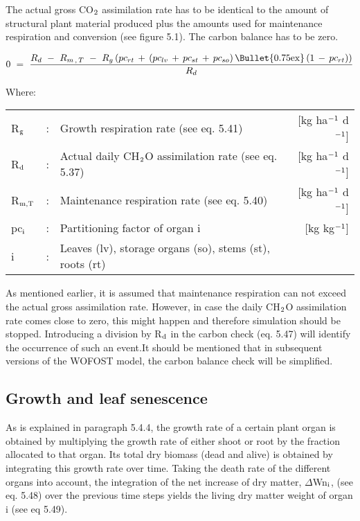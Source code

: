 The actual gross CO$_{{\rm 2}}$ assimilation rate has to be identical to the amount of structural plant
material produced plus the amounts used for maintenance respiration and conversion (see
figure 5.1). The carbon balance has to be zero. 

\begin{equation}
0~=~{\frac{R _{d} ~-~ R _{m\, ,\, T} ~-~ R _{g} \, (pc _{rt} \, +\, (pc _{lv} \, +\, pc _{st} \, +\, pc _{so} )\, {\rm \Bullet{0.75ex}}\, (1\, -\, pc _{rt} ))}{R_{d}}}  
\end{equation}

Where:\\
\begin{tabularx}{\textwidth}{llXr}
R$_{{\rm g}}$ &:& Growth respiration rate (see eq. 5.41)   &
     [kg ha$^{{\rm -1}}$ d$^{{\rm -1}}$]\\
R$_{{\rm d}}$ &:& Actual daily CH$_{{\rm 2}}$O assimilation rate (see eq. 5.37)   &
     [kg ha$^{{\rm -1}}$ d$^{{\rm -1}}$]\\
R$_{{\rm m,T}}$ &:& Maintenance respiration rate (see eq. 5.40)   &
     [kg ha$^{{\rm -1}}$ d$^{{\rm -1}}$]\\
pc$_{{\rm i}}$ &:& Partitioning factor of organ i    &
     [kg kg$^{{\rm -1}}$]\\
i &:& Leaves (lv), storage organs (so), stems (st), roots (rt)\\
\end{tabularx}

As mentioned earlier, it is assumed that maintenance respiration can not exceed the actual
gross assimilation rate. However, in case the daily CH$_{{\rm 2}}$O assimilation rate comes close to
zero, this might happen and therefore simulation should be stopped. Introducing a
division by R$_{{\rm d}}$ in the carbon check (eq. 5.47) will identify the occur\-rence of such an
event.It should be mentioned that in subsequent versions of the WOFOST model, the carbon
balance check will be simplified.

\subsection{Growth and leaf senescence  }

As is explained in paragraph 5.4.4, the growth rate of a certain plant organ is obtained by
multi\-plying the growth rate of either shoot or root by the fraction allocated to that organ.
Its total dry biomass (dead and alive) is obtained by integrating this growth rate over
time. Taking the death rate of the different organs into account, the integration of the net
increase of dry matter, $\Delta$Wn$_{{\rm i}}$, (see eq. 5.48) over the previous time steps 
yields the living dry matter weight of organ i (see eq 5.49).

